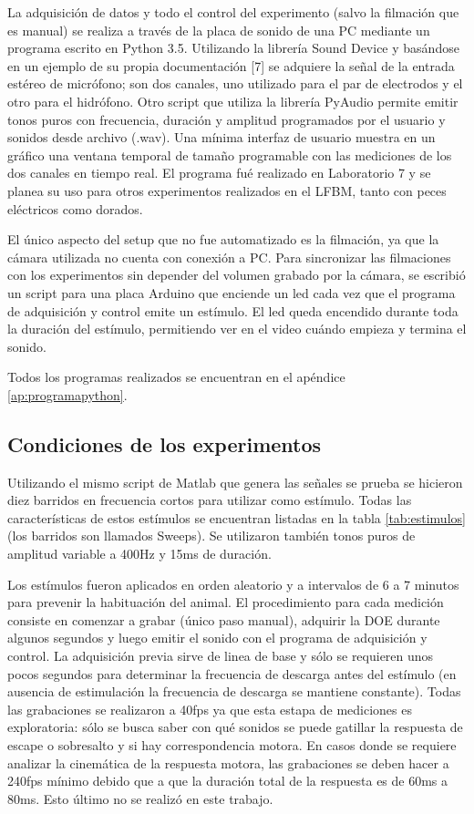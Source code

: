 La adquisición de datos y todo el control del experimento (salvo la filmación que es manual) se realiza a través de la placa de sonido de una PC mediante un programa escrito en Python 3.5. Utilizando la librería Sound Device y basándose en un ejemplo de su propia documentación [7] se adquiere la señal de la entrada estéreo de micrófono; son dos canales, uno utilizado para el par de electrodos y el otro para el hidrófono. Otro script que utiliza la librería PyAudio permite emitir tonos puros con frecuencia, duración y amplitud programados por el usuario y sonidos desde archivo (.wav). Una mínima interfaz de usuario muestra en un gráfico una ventana temporal de tamaño programable con las mediciones de los dos canales en tiempo real. El programa fué realizado en Laboratorio 7 y se planea su uso para otros experimentos realizados en el LFBM, tanto con peces eléctricos como dorados.

El único aspecto del setup que no fue automatizado es la filmación, ya que la cámara utilizada no cuenta con conexión a PC. Para sincronizar las filmaciones con los experimentos sin depender del volumen grabado por la cámara, se escribió un script para una placa Arduino que enciende un led cada vez que el programa de adquisición y control emite un estímulo. El led queda encendido durante toda la duración del estímulo, permitiendo ver en el video cuándo empieza y termina el sonido.

Todos los programas realizados se encuentran en el apéndice \ref{ap:programapython}.

\subsection{Condiciones de los experimentos}

Utilizando el mismo script de Matlab que genera las señales se prueba se hicieron diez barridos en frecuencia cortos para utilizar como estímulo. Todas las características de estos estímulos se encuentran listadas en la tabla \ref{tab:estimulos} (los barridos son llamados Sweeps). Se utilizaron también tonos puros de amplitud variable a 400Hz y 15ms de duración.

Los estímulos fueron aplicados en orden aleatorio y a intervalos de 6 a 7 minutos para prevenir la habituación del animal. El procedimiento para cada medición consiste en comenzar a grabar (único paso manual), adquirir la DOE durante algunos segundos y luego emitir el sonido con el programa de adquisición y control. La adquisición previa sirve de linea de base y sólo se requieren unos pocos segundos para determinar la frecuencia de descarga antes del estímulo (en ausencia de estimulación la frecuencia de descarga se mantiene constante). Todas las grabaciones se realizaron a 40fps ya que esta estapa de mediciones es exploratoria: sólo se busca saber con qué sonidos se puede gatillar la respuesta de escape o sobresalto y si hay correspondencia motora. En casos donde se requiere analizar la cinemática de la respuesta motora, las grabaciones se deben hacer a 240fps mínimo debido que a que la duración total de la respuesta es de 60ms a 80ms. Esto último no se realizó en este trabajo.

